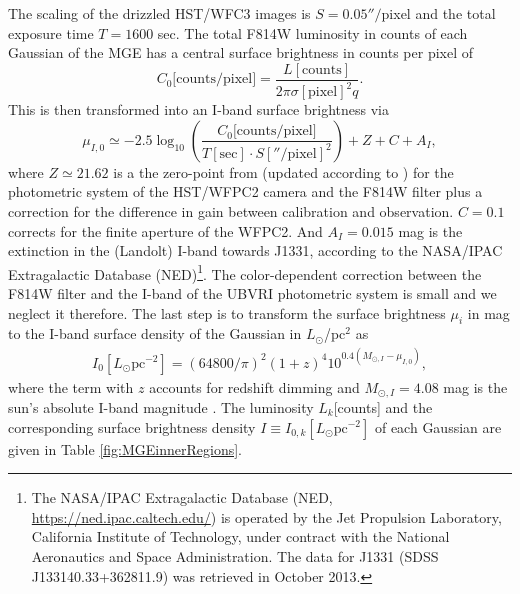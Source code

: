 The scaling of the drizzled HST/WFC3 images is  $S = 0.05''/$pixel and the total exposure time $T = 1600$ sec. The total F814W luminosity in counts of each Gaussian of the MGE has a central surface brightness in counts per pixel of
\begin{equation*}
C_0\text{[counts/pixel]} = \frac{L[\text{counts}]}{2\pi \sigma[\text{pixel}]^2 q}.
\end{equation*}
This is then transformed into an I-band surface brightness via
\begin{equation}
\mu_{I,0} \simeq -2.5 \log_{10}\left( \frac{C_0\text{[counts/pixel]}}{T[\text{sec}] \cdot S[''/\text{pixel}]^2}\right) + Z + C + A_I, \label{eq:muI_}
\end{equation}
 where $Z\simeq21.62$ is a the zero-point from \citet{Holtzman}  (updated according to \citet{Dolphin,DolphinNew}) for the photometric system of the HST/WFPC2 camera and the F814W filter plus a correction for the difference in gain between calibration and observation. $C= 0.1$ corrects for the finite aperture of the WFPC2. And $A_I =0.015$ mag  is the extinction in the (Landolt) I-band towards J1331, according to the NASA/IPAC Extragalactic Database (NED)\footnote{The NASA/IPAC Extragalactic Database (NED, \url{https://ned.ipac.caltech.edu/}) is operated by the Jet Propulsion Laboratory, California Institute of Technology, under contract with the National Aeronautics and Space Administration. The data for J1331 (SDSS J133140.33+362811.9) was retrieved in October 2013.}. The color-dependent correction between the F814W filter and the I-band of the UBVRI photometric system is  small \citep{Holtzman} and we neglect it therefore. The last step is to transform the surface brightness $\mu_i$ in mag to the I-band surface density of the Gaussian in $L_\odot$/pc$^2$ as
\begin{eqnarray*}
I_0[L_\odot \text{pc}^{-2}] = \left( 64800/\pi\right)^2 \left(1+z \right)^4 10^{0.4\left(M_{\odot,I}-\mu_{I,0} \right)},
\end{eqnarray*}
where the term with $z$ accounts for redshift dimming and $M_{\odot,I}=4.08$ mag is the sun's absolute I-band magnitude \citep{1998gaas.book.....B}. The luminosity $L_k$[counts] and the corresponding surface brightness density $I \equiv I_{0,k}[L_\odot \text{pc}^{-2}]$ of each Gaussian are given in Table \ref{fig:MGEinnerRegions}. 

